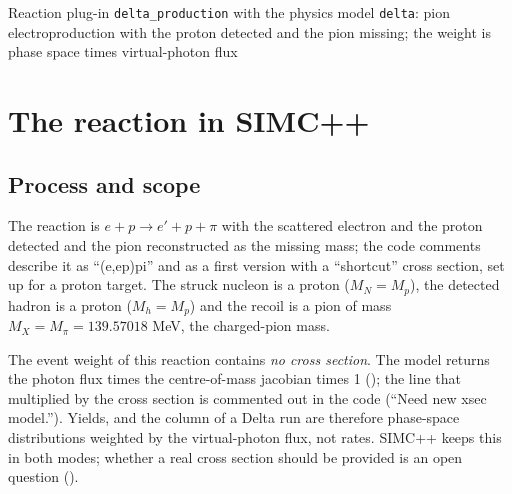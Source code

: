 \documentclass{simcnote}
\begin{document}
%
  {Reaction plug-in \texttt{delta\_production} with the physics model \texttt{delta}: pion electroproduction with the
   proton detected and the pion missing; the weight is phase space times virtual-photon flux}
\simcnotemaketitle
{}
\simcnotetoc

\section{The reaction in SIMC++}

\subsection{Process and scope}
The reaction is $e + p \to e' + p + \pi$ with the scattered electron and the proton detected and the pion
reconstructed as the missing mass; the code comments describe it as ``(e,e\pr p)pi'' and as a first version with a
``shortcut'' cross section, set up for a proton target. The struck nucleon is a proton ($M_N=M_p$), the detected hadron
is a proton ($M_h=M_p$) and the recoil is a pion of mass $M_X=M_\pi=139.57018$ MeV, the charged-pion mass.

\begin{simcwarning}
The event weight of this reaction contains \emph{no cross section}. The model returns the photon flux times the
centre-of-mass jacobian times 1 (); the line that multiplied by the cross section is commented out in
the code (``Need new xsec model.''). Yields,  and the column  of a Delta run are therefore
phase-space distributions weighted by the virtual-photon flux, not rates. SIMC++ keeps this in both modes; whether a
real cross section should be provided is an open question ().
\end{simcwarning}
\end{document}
